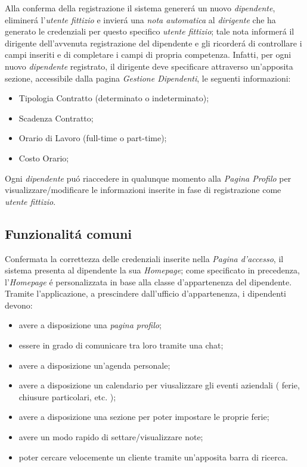 \documentclass[paper=a4, fontsize=11pt]{scrartcl} %
\numberwithin{equation}{section} %
\numberwithin{figure}{section} %
\numberwithin{table}{section} %
\begin{document}
Alla conferma della registrazione il sistema generer\'a un nuovo \textit{dipendente}, eliminer\'a
l'\textit{utente fittizio} e invier\'a una \textit{nota automatica} al \textit{dirigente}
che ha generato le credenziali per questo specifico \textit{utente fittizio}; tale nota informer\'a il dirigente
dell'avvenuta registrazione del dipendente e gli ricorder\'a di controllare i campi inseriti e di completare i campi
di propria competenza. Infatti, per ogni nuovo \textit{dipendente} registrato, il dirigente deve specificare attraverso
un'apposita sezione, accessibile dalla pagina \textit{Gestione Dipendenti}, le seguenti informazioni:
\begin{itemize}
	\item Tipologia Contratto (determinato o indeterminato);
	\item Scadenza Contratto;
	\item Orario di Lavoro (full-time o part-time);
	\item Costo Orario;
\end{itemize}


Ogni \textit{dipendente} pu\'o riaccedere in qualunque momento alla \textit{Pagina Profilo}
per visualizzare/modificare le informazioni inserite in fase di registrazione come \textit{utente fittizio}.

\subsection{Funzionalit\'a comuni}

Confermata la correttezza delle credenziali inserite
nella \textit{Pagina d'accesso}, il sistema presenta al dipendente la sua \textit{Homepage};
come specificato in precedenza, l'\textit{Homepage} \'e personalizzata in base alla classe d'appartenenza del dipendente.\\
Tramite l'applicazione, a prescindere dall'ufficio d'appartenenza, i dipendenti devono:
\begin{itemize}
\item avere a disposizione una \textit{pagina profilo};
\item essere in grado di comunicare tra loro tramite una chat;
\item avere a disposizione un'agenda personale;
\item avere a disposizione un calendario per viusalizzare gli eventi aziendali ( ferie, chiusure particolari, etc. );
\item avere a disposizione una sezione per poter impostare le proprie ferie;
\item avere un modo rapido di settare/visualizzare note;
\item poter cercare velocemente un cliente tramite un'apposita barra di ricerca.
\end{itemize}
\end{document}
